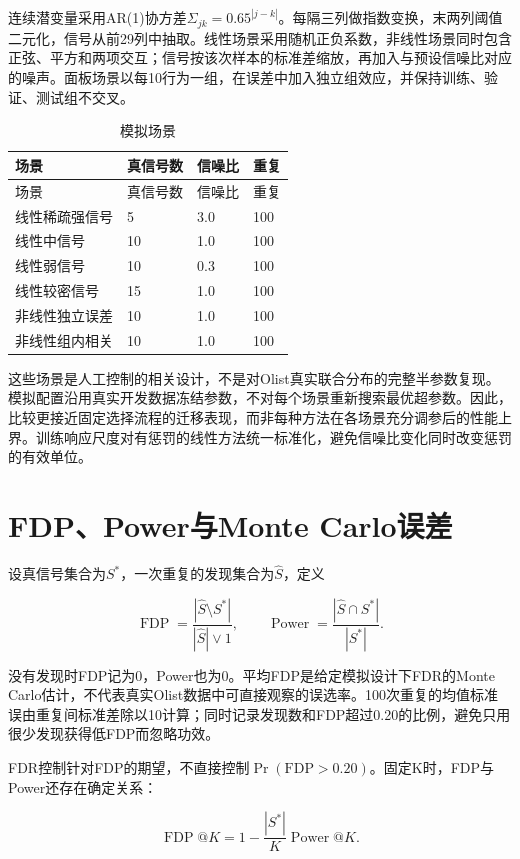 \documentclass{sufethesismas}
\begin{document}
连续潜变量采用AR(1)协方差\(\Sigma_{jk}=0.65^{|j-k|}\)。每隔三列做指数变换，末两列阈值二元化，信号从前29列中抽取。线性场景采用随机正负系数，非线性场景同时包含正弦、平方和两项交互；信号按该次样本的标准差缩放，再加入与预设信噪比对应的噪声。面板场景以每10行为一组，在误差中加入独立组效应，并保持训练、验证、测试组不交叉。

{
\footnotesize
\begin{longtable}[]{@{}llll@{}}
\caption{模拟场景}\tabularnewline
\toprule\noalign{}
场景 & 真信号数 & 信噪比 & 重复 \\
\midrule\noalign{}
\endfirsthead
\toprule\noalign{}
场景 & 真信号数 & 信噪比 & 重复 \\
\midrule\noalign{}
\endhead
\bottomrule\noalign{}
\endlastfoot
线性稀疏强信号 & 5 & 3.0 & 100 \\
线性中信号 & 10 & 1.0 & 100 \\
线性弱信号 & 10 & 0.3 & 100 \\
线性较密信号 & 15 & 1.0 & 100 \\
非线性独立误差 & 10 & 1.0 & 100 \\
非线性组内相关 & 10 & 1.0 & 100 \\
\end{longtable}
}

这些场景是人工控制的相关设计，不是对Olist真实联合分布的完整半参数复现。模拟配置沿用真实开发数据冻结参数，不对每个场景重新搜索最优超参数。因此，比较更接近固定选择流程的迁移表现，而非每种方法在各场景充分调参后的性能上界。训练响应尺度对有惩罚的线性方法统一标准化，避免信噪比变化同时改变惩罚的有效单位。

\section{FDP、Power与Monte Carlo误差}

设真信号集合为\(S^\ast\)，一次重复的发现集合为\(\widehat S\)，定义

\[
\operatorname{FDP}=\frac{|\widehat S\setminus S^\ast|}
{|\widehat S|\vee1},\qquad
\operatorname{Power}=\frac{|\widehat S\cap S^\ast|}{|S^\ast|}.
\]

没有发现时FDP记为0，Power也为0。平均FDP是给定模拟设计下FDR的Monte Carlo估计，不代表真实Olist数据中可直接观察的误选率。100次重复的均值标准误由重复间标准差除以10计算；同时记录发现数和FDP超过0.20的比例，避免只用很少发现获得低FDP而忽略功效。

FDR控制针对FDP的期望，不直接控制\(\Pr(\mathrm{FDP}>0.20)\)。固定K时，FDP与Power还存在确定关系：

\[
\operatorname{FDP}@K
=1-\frac{|S^\ast|}{K}\operatorname{Power}@K.
\]
\end{document}
